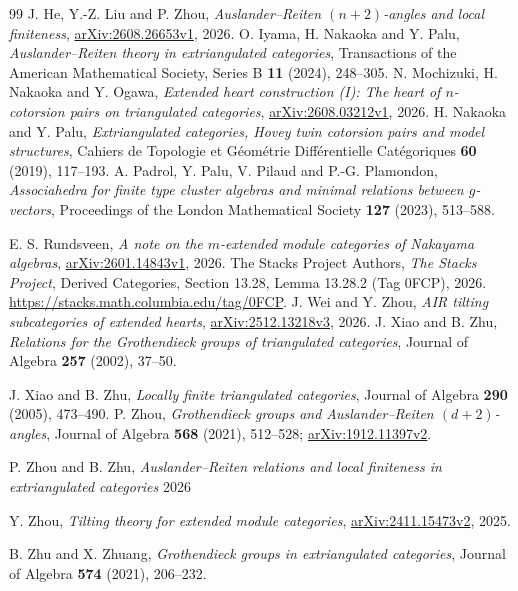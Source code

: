 \documentclass[pdflatex,sn-mathphys-num]{sn-jnl}
\numberwithin{equation}{section}
\theoremstyle{definition}
\theoremstyle{remark}\newtheorem{remark}[theorem]{Remark}
\begin{document}
\begin{thebibliography}{99}
J. He, Y.-Z. Liu and P. Zhou, \emph{Auslander--Reiten $(n+2)$-angles
and local finiteness},
\href{https://arxiv.org/abs/2608.26653v1}{arXiv:2608.26653v1}, 2026.
O. Iyama, H. Nakaoka and Y. Palu, \emph{Auslander--Reiten theory in
extriangulated categories}, Transactions of the American Mathematical
Society, Series B \textbf{11} (2024), 248--305.
N. Mochizuki, H. Nakaoka and Y. Ogawa, \emph{Extended heart construction
(I): The heart of $n$-cotorsion pairs on triangulated categories},
\href{https://arxiv.org/abs/2608.03212v1}{arXiv:2608.03212v1}, 2026.
H. Nakaoka and Y. Palu, \emph{Extriangulated categories, Hovey twin
cotorsion pairs and model structures}, Cahiers de Topologie et G\'eom\'etrie
Diff\'erentielle Cat\'egoriques \textbf{60} (2019), 117--193.
A. Padrol, Y. Palu, V. Pilaud and P.-G. Plamondon,
\emph{Associahedra for finite type cluster algebras and minimal relations
between $g$-vectors}, Proceedings of the London Mathematical Society
\textbf{127} (2023), 513--588.

E. S. Rundsveen, \emph{A note on the $m$-extended module categories of
Nakayama algebras},
\href{https://arxiv.org/abs/2601.14843v1}{arXiv:2601.14843v1}, 2026.
The Stacks Project Authors, \emph{The Stacks Project}, Derived Categories,
Section 13.28, Lemma 13.28.2 (Tag 0FCP), 2026.
\url{https://stacks.math.columbia.edu/tag/0FCP}.
J. Wei and Y. Zhou, \emph{AIR tilting subcategories of extended hearts},
\href{https://arxiv.org/abs/2512.13218v3}{arXiv:2512.13218v3}, 2026.
J. Xiao and B. Zhu, \emph{Relations for the Grothendieck groups of
triangulated categories}, Journal of Algebra \textbf{257} (2002), 37--50.

J. Xiao and B. Zhu, \emph{Locally finite triangulated categories},
Journal of Algebra \textbf{290} (2005), 473--490.
P. Zhou, \emph{Grothendieck groups and Auslander--Reiten $(d+2)$-angles},
Journal of Algebra \textbf{568} (2021), 512--528;
\href{https://arxiv.org/abs/1912.11397v2}{arXiv:1912.11397v2}.

P. Zhou and B. Zhu, \emph{Auslander–Reiten relations and local finiteness in extriangulated categories} 2026

Y. Zhou, \emph{Tilting theory for extended module categories},
\href{https://arxiv.org/abs/2411.15473v2}{arXiv:2411.15473v2}, 2025.

B. Zhu and X. Zhuang, \emph{Grothendieck groups in extriangulated
categories}, Journal of Algebra \textbf{574} (2021), 206--232.


\end{thebibliography}
\end{document}
